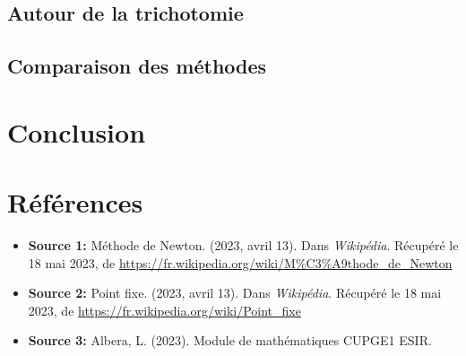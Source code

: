 \documentclass[12pt]{article}
\begin{document}
\subsection{Autour de la trichotomie}
\subsection{Comparaison des méthodes}


\section{Conclusion}



\section{Références}
\label{ref:Références}
\begin{itemize}
    \item \textbf{Source 1:} Méthode de Newton. (2023, avril 13). Dans \textit{Wikipédia}. Récupéré le 18 mai 2023, de \url{https://fr.wikipedia.org/wiki/M%C3%A9thode_de_Newton}
    
    \item \textbf{Source 2:} Point fixe. (2023, avril 13). Dans \textit{Wikipédia}. Récupéré le 18 mai 2023, de \url{https://fr.wikipedia.org/wiki/Point_fixe}
    
    \item \textbf{Source 3:} Albera, L. (2023). Module de mathématiques CUPGE1 ESIR.
\end{itemize}
\end{document}
